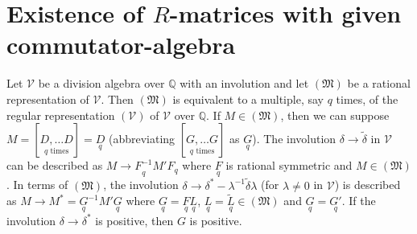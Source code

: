 \section{Existence of $R$-matrices with given commutator-algebra}
Let $\mathscr{V}$ be a division algebra over $\mathbb{Q}$ with an
involution and let $(\mathfrak{M})$ be a rational representation of
$\mathscr{V}$. Then $(\mathfrak{M})$ is equivalent to a multiple, say
$q$ times, of the regular representation $(\mathscr{V})$ of
$\mathscr{V}$ over $\mathbb{Q}$. If $M \in (\mathfrak{M})$, then we
can suppose $M =[\underset{q \text{ times}}{D,\ldots D}]=
\underset{q}{D}$ (abbreviating $[\underset{q\text{ times}}{G,\ldots G}]$
as $\underset{q}{G}$). The involution $\delta \rightarrow
\widetilde{\delta}$ in $\mathscr{V}$ can be described as $M
\rightarrow \underset{q}{F^{-1}}M' F_q$ where $\underset{q}{F}$ is
rational symmetric and $M \in (\mathfrak{M})$. In terms of
$(\mathfrak{M})$, the involution $\delta \rightarrow \delta^{\ast} -
\lambda^{-1}\widetilde{\delta} \lambda$ (for $\lambda \neq 0$ in
$\mathscr{V}$) is described as $M \rightarrow M^{\ast} =
\underset{q}{G}^{-1}M'\underset{q}{G}$ where $\underset{q}{G} =
\underset{q}{F} \underset{q}{L}$, $\underset{q}{L}=
\widetilde{\underset{q}{L}} \in (\mathfrak{M})$ and $\underset{q}{G} =
\underset{q}{G'}$. If the involution $\delta\rightarrow \delta^{\ast}$
is positive, then $G$ is positive.

